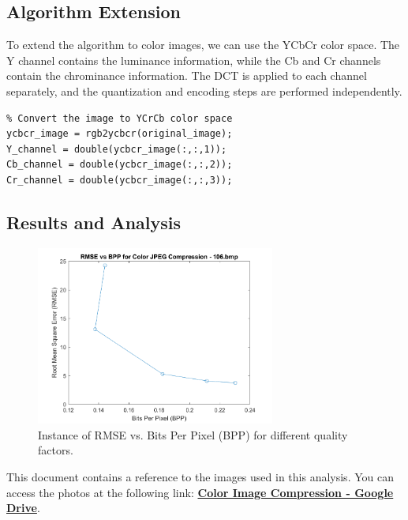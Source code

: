 \documentclass{article}
\begin{document}
\subsection{Algorithm Extension}
To extend the algorithm to color images, we can use the YCbCr color space. The Y channel contains the luminance information, while the Cb and Cr channels contain the chrominance information. The DCT is applied to each channel separately, and the quantization and encoding steps are performed independently.

\begin{lstlisting}
% Convert the image to YCrCb color space
ycbcr_image = rgb2ycbcr(original_image);
Y_channel = double(ycbcr_image(:,:,1));
Cb_channel = double(ycbcr_image(:,:,2));
Cr_channel = double(ycbcr_image(:,:,3));
\end{lstlisting}

\subsection{Results and Analysis}
\begin{figure}[!htb]
    \centering
    \includegraphics[width=0.7\textwidth]{images/106_color_rmse_vs_bpp.png}
    \caption{Instance of RMSE vs. Bits Per Pixel (BPP) for different quality factors.}
    \label{fig:color_rmse_bpp_plot}
\end{figure}

This document contains a reference to the images used in this analysis. You can access the photos at the following link:  
\href{https://drive.google.com/drive/folders/1qtCNxamLRdX4h_0CIhrqge2lhjIW8rnh?usp=sharing}{\textbf{Color Image Compression - Google Drive}}.
\end{document}
